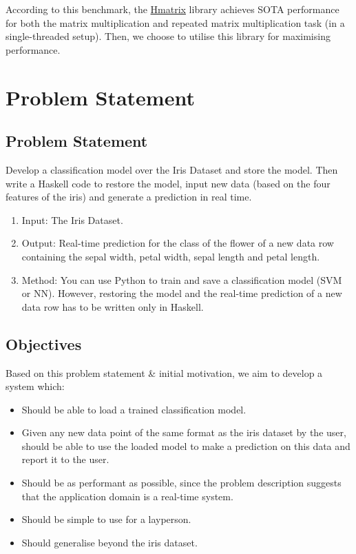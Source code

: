 \documentclass[12pt, titlepage]{article}
\begin{document}
According to this benchmark, the \href{https://hackage.haskell.org/package/hmatrix}{Hmatrix} library achieves SOTA performance for both the matrix multiplication and repeated matrix multiplication task (in a single-threaded setup). Then, we choose to utilise this library for maximising performance.

\section{Problem Statement}
\subsection{Problem Statement}
Develop a classification model over the Iris Dataset and store the model. Then write a Haskell code to restore the model, input new data (based on the four features of the iris) and generate a prediction in real time.
\begin{enumerate}
	\item Input: The Iris Dataset.
	\item Output: Real-time prediction for the class of the flower of a new data row containing the sepal width, petal width, sepal length and petal length.
	\item Method: You can use Python to train and save a classification model (SVM or NN). However, restoring the model and the real-time prediction of a new data row has to be written only in Haskell.
\end{enumerate}

\subsection{Objectives}
Based on this problem statement \& initial motivation, we aim to develop a system which:
\begin{itemize}
	\item Should be able to load a trained classification model.
	\item Given any new data point of the same format as the iris dataset by the user, should be able to use the loaded model to make a prediction on this data and report it to the user.
	\item Should be as performant as possible, since the problem description suggests that the application domain is a real-time system.
	\item Should be simple to use for a layperson.
	\item Should generalise beyond the iris dataset.
\end{itemize}
\end{document}
